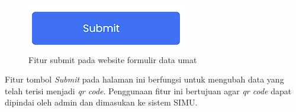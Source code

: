 \begin{figure}[H]
	\centering
	\includegraphics[scale=0.7]{Gambar/fiturSubmit.png}
	\caption{Fitur submit pada website formulir data umat} 
	\label{fig:fiturSubmit}
\end{figure}

Fitur tombol \textit{Submit} pada halaman ini berfungsi untuk mengubah data yang telah terisi menjadi \textit{qr code}. Penggunaan fitur ini bertujuan agar \textit{qr code} dapat dipindai oleh admin dan dimasukan ke sistem SIMU.




